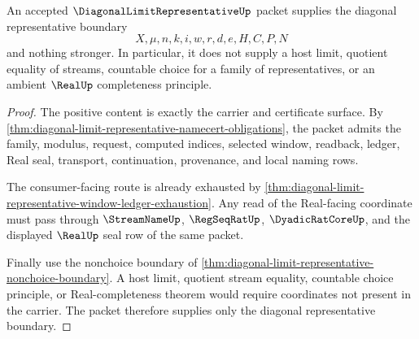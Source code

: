 \begin{theorem}
\label{thm:diagonal-limit-representative-completion-boundary}
An accepted $\DiagonalLimitRepresentativeUp$ packet supplies the diagonal representative boundary
$$
X,\mu,n,k,i,w,r,d,e,H,C,P,N
$$
and nothing stronger. In particular, it does not supply a host limit, quotient equality of streams, countable choice for a family of representatives, or an ambient $\RealUp$ completeness principle.
\end{theorem}
\begin{proof}
The positive content is exactly the carrier and certificate surface. By \autoref{thm:diagonal-limit-representative-namecert-obligations}, the packet admits the family, modulus, request, computed indices, selected window, readback, ledger, Real seal, transport, continuation, provenance, and local naming rows.

The consumer-facing route is already exhausted by \autoref{thm:diagonal-limit-representative-window-ledger-exhaustion}. Any read of the Real-facing coordinate must pass through $\StreamNameUp$, $\RegSeqRatUp$, $\DyadicRatCoreUp$, and the displayed $\RealUp$ seal row of the same packet.

Finally use the nonchoice boundary of \autoref{thm:diagonal-limit-representative-nonchoice-boundary}. A host limit, quotient stream equality, countable choice principle, or Real-completeness theorem would require coordinates not present in the carrier. The packet therefore supplies only the diagonal representative boundary.
\end{proof}


